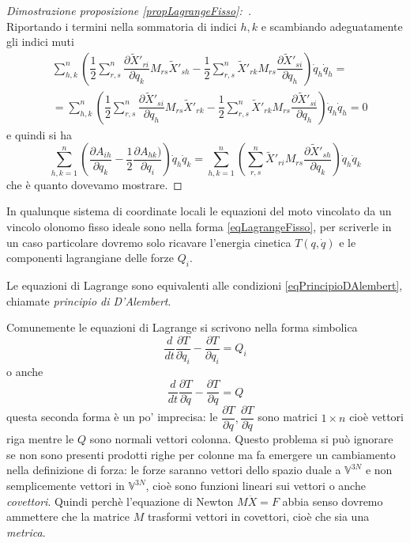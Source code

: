 \documentclass[11pt,a4paper,twoside]{book}
\newenvironment{dimo}[1][\proofname]{
	\begin{tcolorbox}[
	breakable, 
	enhanced, 
	interior hidden, 
	frame hidden, 
	borderline west = {1pt}{0pt}{gray}, 
	top=0pt, bottom=0pt, left=0pt]
\begin{proof}[#1:~]
}
{
\end{proof}
\end{tcolorbox}
}
\theoremstyle{esss}
\theoremstyle{dotless}
\numberwithin{equation}{section} %
\begin{document}
\begin{dimo}[Dimostrazione proposizione \ref{propLagrangeFisso}]
\[\]
Riportando i termini nella sommatoria di indici $h,k$ e scambiando adeguatamente gli indici muti
\begin{align*}
&\sum_{h,k}^n \left(\dfrac{1}{2}\sum_{r,s}^n \dfrac{\partial \tilde{X}'_{ri}}{\partial q_k} 
 M_{rs} \tilde{X}'_{sh} -\dfrac{1}{2}\sum_{r,s}^n \tilde{X}'_{rk} M_{rs} \dfrac{\partial\tilde{X}'_{si}}{\partial q_h} \right) \dot{q}_h \dot{q}_h =\\
&=\sum_{h,k}^n \left(\dfrac{1}{2} \sum_{r,s}^n \dfrac{\partial \tilde{X}'_{si}}{\partial q_h} 
 M_{rs} \tilde{X}'_{rk} -\dfrac{1}{2}\sum_{r,s}^n \tilde{X}'_{rk} M_{rs} \dfrac{\partial\tilde{X}'_{si}}{\partial q_h} \right) \dot{q}_h \dot{q}_h =0
\end{align*}
e quindi  si ha
\[
\sum_{h,k=1}^n \left( \dfrac{\partial A_{ih}}{\partial q_k}  - \dfrac{1}{2} \dfrac{\partial A_{hk})}{\partial q_i} 
\right)\dot{q}_h\dot{q}_k =
\sum_{h,k=1}^n \left(
\sum_{r,s}^n
 \tilde{X}'_{ri} M_{rs}  \dfrac{\partial\tilde{X}'_{sh}}{\partial q_k}
\right)\dot{q}_h\dot{q}_k 
\]
che è quanto dovevamo mostrare. \qedhere
\end{dimo}

In qualunque sistema di coordinate locali le equazioni del moto vincolato da un vincolo olonomo fisso ideale sono nella forma \eqref{eqLagrangeFisso}, per scriverle in un caso particolare dovremo solo ricavare l'energia cinetica $T(q,\dot{q})$ e le componenti lagrangiane delle forze $Q_i$.

Le equazioni di Lagrange sono equivalenti alle condizioni \eqref{eqPrincipioDAlembert}, chiamate \textit{principio di D'Alembert}.

Comunemente le equazioni di Lagrange si scrivono nella forma simbolica
\[
\dfrac{d}{dt}\dfrac{\partial T}{\partial \dot{q}_i} - \dfrac{\partial T}{\partial q_i} = Q_i
\]
o anche
\[
\dfrac{d}{dt}\dfrac{\partial T}{\partial \dot{q}} - \dfrac{\partial T}{\partial q} = Q
\]
questa seconda forma è un po' imprecisa: le $\dfrac{\partial T}{\partial q}, \dfrac{\partial T}{\partial \dot{q}}$ sono matrici $1\times n$ cioè vettori riga mentre le $Q$ sono normali vettori colonna. Questo problema si può ignorare se non sono presenti prodotti righe per colonne ma fa emergere un cambiamento nella definizione di forza: le forze saranno vettori dello spazio duale a $\mathbb{V}^{3N}$ e non semplicemente vettori in $\mathbb{V}^{3N}$, cioè sono funzioni lineari sui vettori o anche \textit{covettori}. 
Quindi perchè l'equazione di Newton $M\ddot{X}=F$ abbia senso dovremo ammettere che la matrice $M$ trasformi vettori in covettori, cioè che sia una \textit{metrica}.
\end{document}
